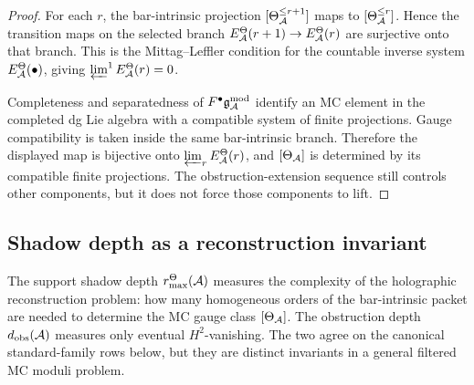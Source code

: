 \begin{proof}
For each \(r\), the bar-intrinsic projection
\([\Theta_{\mathcal{A}}^{\le r+1}]\) maps to
\([\Theta_{\mathcal{A}}^{\le r}]\).  Hence the transition maps on the selected
branch \(E^\Theta_{\mathcal{A}}(r+1)\to E^\Theta_{\mathcal{A}}(r)\) are surjective onto
that branch.  This is the Mittag--Leffler condition for the countable
inverse system \(E^\Theta_{\mathcal{A}}(\bullet)\), giving
\(\varprojlim^1 E^\Theta_{\mathcal{A}}(r)=0\).

Completeness and separatedness of \(F^\bullet\mathfrak{g}_{\mathcal{A}}^{\mathrm{mod}}\) identify an MC
element in the completed dg Lie algebra with a compatible system of
finite projections.  Gauge compatibility is taken inside the same
bar-intrinsic branch.  Therefore the displayed map is bijective onto
\(\varprojlim_r E^\Theta_{\mathcal{A}}(r)\), and \([\Theta_{\mathcal{A}}]\) is determined
by its compatible finite projections.  The obstruction-extension
sequence still controls other components, but it does not force those
components to lift.
\end{proof}


\subsection{Shadow depth as a reconstruction invariant}

The support shadow depth \(r^\Theta_{\max}(\mathcal{A})\) measures the
complexity of the holographic reconstruction problem: how many
homogeneous orders of the bar-intrinsic packet are needed to determine
the MC gauge class \([\Theta_{\mathcal{A}}]\).  The obstruction depth
\(d_{\mathrm{obs}}(\mathcal{A})\) measures only eventual \(H^2\)-vanishing.
The two agree on the canonical standard-family rows below, but they
are distinct invariants in a general filtered MC moduli problem.

